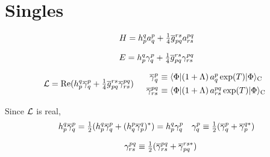 \documentclass[11pt]{article}
\numberwithin{equation}{section}
\begin{document}
\setlength{\abovedisplayskip}{3pt}
\setlength{\belowdisplayskip}{3pt}


\setcounter{section}{7}
\section{Singles}

\begin{align}
  H
=
  h_p^q
  a^p_q
+
  \tfrac{1}{4}
  \overline{g}_{pq}^{rs}
  a^{pq}_{rs}
\end{align}

\begin{align}
  E
=
  h_p^q
  \gamma ^p_q
+
  \tfrac{1}{4}
  \overline{g}_{pq}^{rs}
  \gamma ^{pq}_{rs}
\end{align}

\begin{align}
  \mc{L}
=
  \mr{Re}
  (
    h_p^q
    \ol{\g}^p_q
  +
    \tfr{1}{4}
    \ol{g}_{pq}^{rs}
    \ol{\g}^{pq}_{rs}
  )
&&
\begin{array}{r@{\ }l}
  \ol{\g}^p_q
&\equiv
  \ip{\F|(1+\La)\,a^p_q\,\mr{exp}(T)|\F}_\mr{C}
\\[4pt]
  \ol{\g}^{pq}_{rs}
&\equiv
  \ip{\F|(1+\La)\,a^{pq}_{rs}\,\mr{exp}(T)|\F}_\mr{C}
\end{array}
\end{align}

Since $\mathcal{L}$ is real, 
\begin{align}
  h_p^q
  \overline{\gamma }^p_q
=
  \tfrac{1}{2}
  (
    h_p^q
    \overline{\gamma }^p_q
  +
    (
    h_q^p
    \overline{\gamma }^q_p
    )^*
  )
=
  h_p^q
  \gamma ^p_q
&&
  \gamma ^p_q
\equiv
  \tfrac{1}{2}
  (
    \overline{\gamma }^p_q
  +
    \overline{\gamma }^{q*}_p
  )
\end{align}

\begin{align}
&&
  \gamma ^{pq}_{rs}
\equiv
  \tfrac{1}{2}
  (
    \overline{\gamma }^{pq}_{rs}
  +
    \overline{\gamma }^{rs*}_{pq}
  )
\end{align}

\begin{align}
\end{align}
\end{document}
